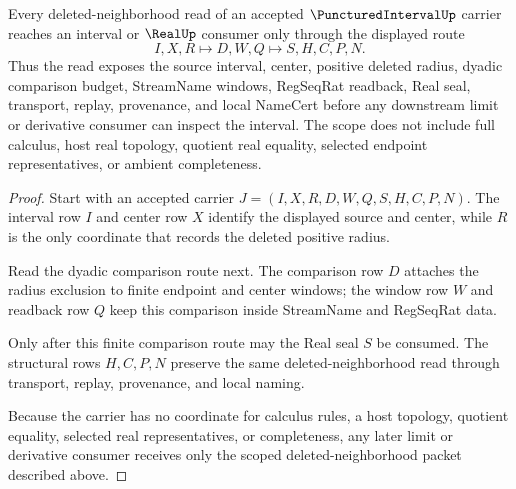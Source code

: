 \begin{theorem}\label{thm:punctured-interval-deleted-neighborhood-scope}
Every deleted-neighborhood read of an accepted $\PuncturedIntervalUp$ carrier reaches an interval or $\RealUp$ consumer only through the displayed route
$$
I,X,R \longmapsto D,W,Q \longmapsto S,H,C,P,N .
$$
Thus the read exposes the source interval, center, positive deleted radius, dyadic comparison budget, StreamName windows, RegSeqRat readback, Real seal, transport, replay, provenance, and local NameCert before any downstream limit or derivative consumer can inspect the interval. The scope does not include full calculus, host real topology, quotient real equality, selected endpoint representatives, or ambient completeness.
\end{theorem}
\begin{proof}
Start with an accepted carrier $J=(I,X,R,D,W,Q,S,H,C,P,N)$. The interval row $I$ and center row $X$ identify the displayed source and center, while $R$ is the only coordinate that records the deleted positive radius.

Read the dyadic comparison route next. The comparison row $D$ attaches the radius exclusion to finite endpoint and center windows; the window row $W$ and readback row $Q$ keep this comparison inside StreamName and RegSeqRat data.

Only after this finite comparison route may the Real seal $S$ be consumed. The structural rows $H,C,P,N$ preserve the same deleted-neighborhood read through transport, replay, provenance, and local naming.

Because the carrier has no coordinate for calculus rules, a host topology, quotient equality, selected real representatives, or completeness, any later limit or derivative consumer receives only the scoped deleted-neighborhood packet described above.
\end{proof}


